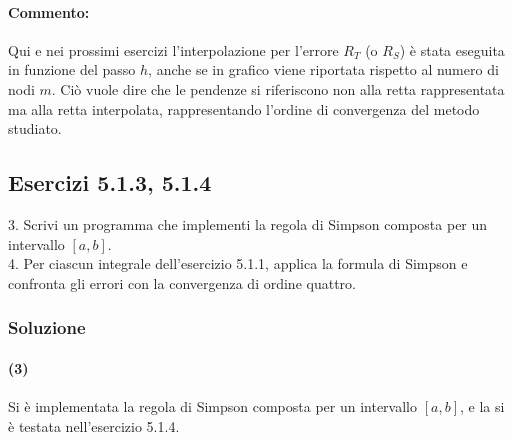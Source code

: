 \documentclass[letterpaper, 12pt]{article}
\numberwithin{equation}{section}    %
\begin{document}
\paragraph{Commento:}Qui e nei prossimi esercizi l'interpolazione per l'errore $R_T$ (o $R_S$) è stata eseguita
in funzione del passo $h$, anche se in grafico viene riportata rispetto al numero di nodi $m$. Ciò vuole
dire che le pendenze si riferiscono non alla retta rappresentata ma alla retta interpolata, rappresentando
l'ordine di convergenza del metodo studiato.  

\subsection{Esercizi 5.1.3, 5.1.4}
3. Scrivi un programma che implementi la regola di Simpson composta per un intervallo $[a,b]$. \\
4. Per ciascun integrale dell'esercizio 5.1.1, applica la formula di Simpson e confronta gli errori con 
la convergenza di ordine quattro.

\subsubsection{Soluzione}
\paragraph{(3)}Si è implementata la regola di Simpson composta per un intervallo $[a,b]$,
e la si è testata nell'esercizio 5.1.4. \\
\end{document}

